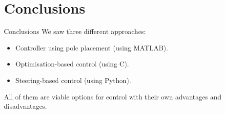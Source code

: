 \section{Conclusions}
\begin{frame}{Conclusions}
We saw three different approaches:
\begin{itemize}
    \item Controller using pole placement (using MATLAB).
    \item Optimisation-based control (using C).
    \item Steering-based control (using Python).
\end{itemize}
All of them are viable options for control with their own advantages and disadvantages.
\end{frame}